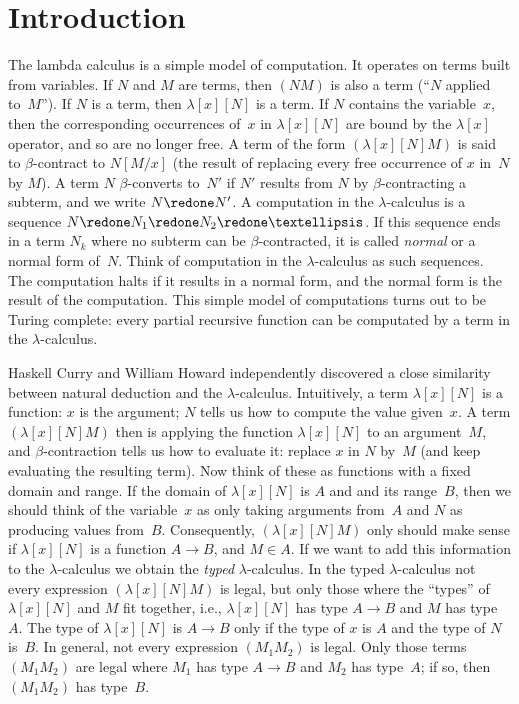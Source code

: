 \documentclass[10pt,a4paper]{article}
\theoremstyle{plain}
\theoremstyle{definition}
\theoremstyle{remark}
\newcommand*{\olfileid}[3]{}
\newcommand*{\olsection}[1]{\section*{#1}}
\providecommand{\lif}{\mathbin{\rightarrow}}
\providecommand{\Subst}[3]{#1[#2/#3]}
\providecommand{\lambd}{\ensuremath{\lambda}}
\begin{document}



\olfileid{int}{pty}{int}

\olsection{Introduction}

The lambda calculus is a simple model of computation. It operates on
terms built from variables. If $N$ and $M$ are terms, then $(NM)$ is
also a term (``$N$ applied to~$M$''). If $N$ is a term, then
$\lambd[x][N]$ is a term. If $N$ contains the variable~$x$, then the
corresponding occurrences of~$x$ in $\lambd[x][N]$ are bound by the
$\lambd[x]$ operator, and so are no longer free. A term of the form
$(\lambd[x][N]M)$ is said to $\beta$-contract to $\Subst{N}{M}{x}$
(the result of replacing every free occurrence of $x$ in~$N$ by $M$).
A term $N$ $\beta$-converts to~$N'$ if $N'$ results from $N$ by
$\beta$-contracting a subterm, and we write $N \redone N'$. A
computation in the $\lambd$-calculus is a sequence $N \redone N_1
\redone N_2 \redone \dots$. If this sequence ends in a term $N_k$
where no subterm can be $\beta$-contracted, it is called \emph{normal}
or a normal form of~$N$. Think of computation in the $\lambd$-calculus
as such sequences. The computation halts if it results in a normal
form, and the normal form is the result of the computation. This
simple model of computations turns out to be Turing complete: every
partial recursive function can be computated by a term in the $\lambd$-calculus.

Haskell Curry and William Howard independently discovered a close
similarity between natural deduction and the $\lambd$-calculus.
Intuitively, a term $\lambd[x][N]$ is a function: $x$ is the argument;
$N$ tells us how to compute the value given~$x$. A term
$(\lambd[x][N]M)$ then is applying the function $\lambd[x][N]$ to an
argument~$M$, and $\beta$-contraction tells us how to evaluate it:
replace $x$ in $N$ by~$M$ (and keep evaluating the resulting term).
Now think of these as functions with a fixed domain and range. If the
domain of $\lambd[x][N]$ is $A$ and and its range~$B$, then we should
think of the variable~$x$ as only taking arguments from~$A$ and $N$ as
producing values from~$B$. Consequently, $(\lambd[x][N]M)$ only should
make sense if $\lambd[x][N]$ is a function $A \to B$, and $M \in A$.
If we want to add this information to the $\lambd$-calculus we obtain
the \emph{typed} $\lambd$-calculus. In the typed $\lambd$-calculus not
every expression $(\lambd[x][N]M)$ is legal, but only those where the
``types'' of $\lambd[x][N]$ and $M$ fit together, i.e., $\lambd[x][N]$
has type $A \lif B$ and $M$ has type~$A$. The type of $\lambd[x][N]$
is $A \to B$ only if the type of $x$ is $A$ and the type of $N$
is~$B$. In general, not every expression $(M_1M_2)$ is legal. Only
those terms $(M_1M_2)$ are legal where $M_1$ has type $A \to B$ and
$M_2$ has type~$A$; if so, then $(M_1M_2)$ has type~$B$. 
\end{document}
